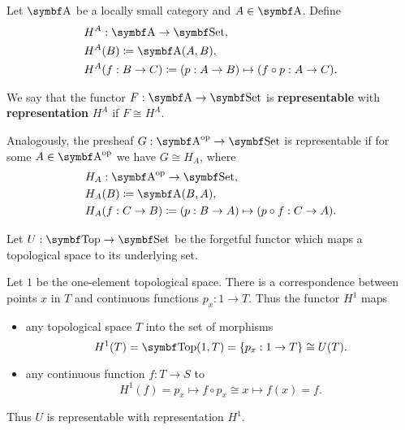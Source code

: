 \begin{definition}\label{def:representable_functor}\cite[definitions 4.1.3, 4.1.16]{Leinster2014}
  Let \( \Bold A \) be a locally small category and \( A \in \Bold A \). Define
  \begin{align*}
    &H^A: \Bold{A} \to \Bold{Set}, \\
    &H^A(B) \coloneqq \Bold{A}(A, B), \\
    &H^A(f: B \to C) \coloneqq (p: A \to B) \mapsto (f \circ p: A \to C).
  \end{align*}

  We say that the functor \( F: \Bold{A} \to \Bold{Set} \) is \textbf{representable} with \textbf{representation} \( H^A \) if \( F \cong H^A \).

  Analogously, the presheaf \( G: \Bold{A}^{\Op} \to \Bold{Set} \) is representable if for some \( A \in \Bold{A}^{\Op} \) we have \( G \cong H_A \), where
  \begin{align*}
    &H_A: \Bold{A}^{\Op} \to \Bold{Set}, \\
    &H_A(B) \coloneqq \Bold{A}(B, A), \\
    &H_A(f: C \to B) \coloneqq (p: B \to A) \mapsto (p \circ f: C \to A).
  \end{align*}
\end{definition}

\begin{example}\label{def:top_representable_functor}\cite[example 4.1.4]{Leinster2014}
  Let \( U: \Bold{Top} \to \Bold{Set} \) be the forgetful functor which maps a topological space to its underlying set.

  Let \( 1 \) be the one-element topological space. There is a correspondence between points \( x \) in \( T \) and continuous functions \( p_x: 1 \to T \). Thus the functor \( H^1 \) maps
  \begin{itemize}
    \item any topological space \( T \) into the set of morphisms
    \begin{equation*}
      H^1(T) = \Bold{Top}(1, T) = \{ p_x: 1 \to T \} \cong U(T).
    \end{equation*}
    \item any continuous function \( f: T \to S \) to
    \begin{equation*}
      H^1(f) = p_x \mapsto f \circ p_x \cong x \mapsto f(x) = f.
    \end{equation*}
  \end{itemize}

  Thus \( U \) is representable with representation \( H^1 \).
\end{example}

